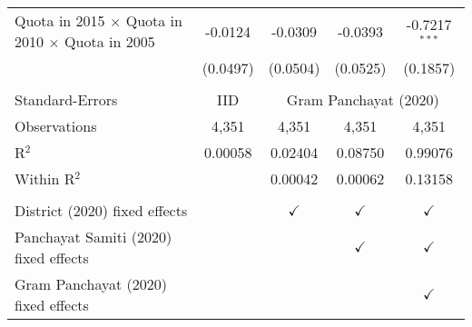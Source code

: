 \begin{tabular}{lcccc}
   Quota in 2015 $\times$ Quota in 2010 $\times$ Quota in 2005 & -0.0124        & -0.0309       & -0.0393       & -0.7217$^{***}$\\   
                                                           & (0.0497)       & (0.0504)      & (0.0525)      & (0.1857)\\   
    \\
   Standard-Errors & IID & \multicolumn{3}{c}{Gram Panchayat (2020)} \\ 
   Observations                                            & 4,351          & 4,351         & 4,351         & 4,351\\  
   R$^2$                                                   & 0.00058        & 0.02404       & 0.08750       & 0.99076\\  
   Within R$^2$                                            &                & 0.00042       & 0.00062       & 0.13158\\  
    \\
   District (2020) fixed effects                           &                & $\checkmark$  & $\checkmark$  & $\checkmark$\\   
   Panchayat Samiti (2020) fixed effects                   &                &               & $\checkmark$  & $\checkmark$\\   
   Gram Panchayat (2020) fixed effects                     &                &               &               & $\checkmark$\\   
   \bottomrule
\end{tabular}
\par\endgroup



